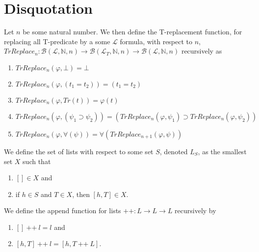 \chapter{Disquotation}\label{chapter:disquotation}
\begin{definition}[T-Replacement]\label{def:T-Replacement}
    Let $n$ be some natural number. We then define the T-replacement function, for replacing all T-predicate by a some $\mathcal{L}$ formula, with respect to $n$, $TrReplace_n : \mathcal{B}(\mathcal{L},\mathbb{N},n) \to \mathcal{B}(\mathcal{L}_T,\mathbb{N},n) \to \mathcal{B}(\mathcal{L},\mathbb{N},n)$ recursively as
    \begin{enumerate}
    \item $TrReplace_n(\varphi,\bot) = \bot$
    \item $TrReplace_n(\varphi,(t_1 = t_2)) = (t_1 = t_2)$
    \item $TrReplace_n(\varphi,Tr(t)) = \varphi(t)$
    \item $TrReplace_n(\varphi,(\psi_1 \supset \psi_2)) = (TrReplace_n(\varphi,\psi_1) \supset TrReplace_n(\varphi,\psi_2))$
    \item $TrReplace_n(\varphi,\forall(\psi)) = \forall(TrReplace_{n + 1}(\varphi,\psi))$
    \end{enumerate}
\end{definition}

\begin{definition}[$L$: List]\label{def:List}
    \leanok
    We define the set of lists with respect to some set $S$, denoted $L_S$, as the smallest set $X$ such that
    \begin{enumerate}
    \item $[] \in X$ and
    \item if $h \in S$ and $T \in X$, then $[h,T] \in X$.
    \end{enumerate}
\end{definition}

\begin{definition}\label{def:List-Append}
    \leanok
    We define the append function for lists $\texttt{++}: L \to L \to L$ recursively by 
    \begin{enumerate}
    \item $[] ~\texttt{++}~ l = l$ and
    \item $[h,T] ~\texttt{++}~ l = [h,T ~\texttt{++}~ L]$.
    \end{enumerate} 
\end{definition}

